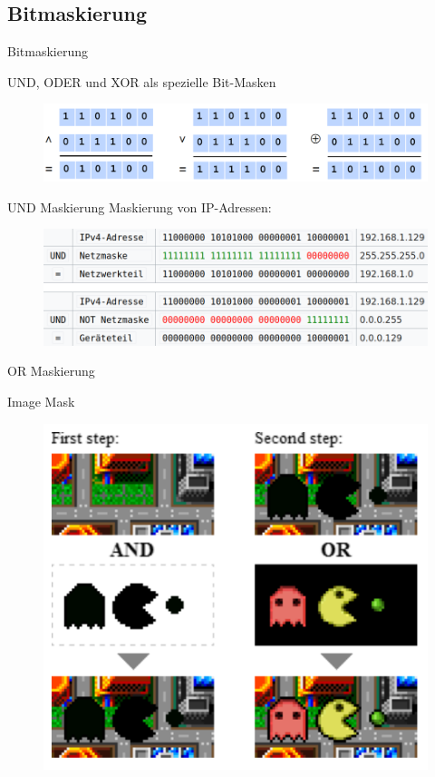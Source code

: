 \documentclass[12pt%
,aspectratio=169%
]{beamer}
\begin{document}
\subsection{Bitmaskierung}
\begin{frame}{Bitmaskierung}
\begin{center}
UND, ODER und XOR als spezielle Bit-Masken
\begin{figure}
\includegraphics[scale=0.35]{pictures/masking}
\end{figure}
\end{center}
\end{frame}

\begin{frame}{UND Maskierung}
Maskierung von IP-Adressen:
\begin{figure}
\includegraphics[scale=0.4]{pictures/UND}
\end{figure}
\end{frame}

\begin{frame}{OR Maskierung}
\begin{center}
Image Mask
\begin{figure}
\includegraphics[scale=0.4]{pictures/OR}
\end{figure}
\end{center}
\end{frame}
\end{document}

